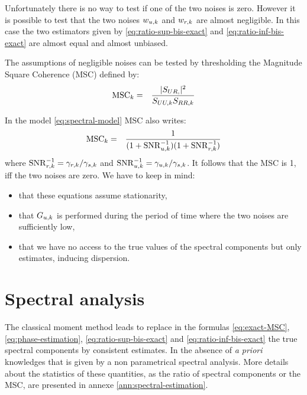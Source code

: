  Unfortunately there is no way to test if one of the two noises is zero. However it is possible to test that the two noises $w_{{u},k}$ and $w_{{r},k}$ are almost negligible. In this case the two estimators given by \eqref{eq:ratio-sup-bis-exact} and \eqref{eq:ratio-inf-bis-exact} are almost equal and almost unbiased. 

The assumptions of negligible noises can be tested by thresholding the Magnitude Square Coherence (MSC) defined by:
\begin{eqnarray}
 \label{eq:MSC-continuous-frequency}
 \mathrm{MSC}_{k} &=& \frac{|S_{UR,}|^{2}}{S_{UU,k}S_{RR,k}}
\end{eqnarray}
 
In the model \eqref{eq:spectral-model} MSC also writes:
\begin{eqnarray}
\label{eq:coherence-in-our-model}
 \mathrm{MSC}_{k} &=& \frac{1}{(1+\mathrm{SNR}^{-1}_{{u},k})(1+\mathrm{SNR}^{-1}_{{r},k})}
\end{eqnarray}
where $\mathrm{SNR}^{-1}_{{r},k}=\gamma_{{r},k}/\gamma_{s,k}$ and $\mathrm{SNR}^{-1}_{{u},k}=\gamma_{{u},k}/\gamma_{s,k}$. It follows that the MSC is 1, iff the two noises are zero. We have to keep in mind:
\begin{itemize}
\item
that these equations assume stationarity,
\item
that $G_{{u},k}$ is performed during the period of time where the two noises are sufficiently low,
\item
that we have no access to the true values of the spectral components but only estimates, inducing dispersion. 
\end{itemize}



\section{Spectral analysis}
The classical moment method leads to replace in the  formulas \eqref{eq:exact-MSC}, \eqref{eq:phase-estimation}, \eqref{eq:ratio-sup-bis-exact}  and \eqref{eq:ratio-inf-bis-exact} the true spectral components by consistent estimates. In the absence of {\it a priori} knowledges that is given by a non parametrical spectral analysis. More details about the statistics of these quantities, as  the ratio of spectral components or the MSC, are presented in annexe \ref{ann:spectral-estimation}. 


